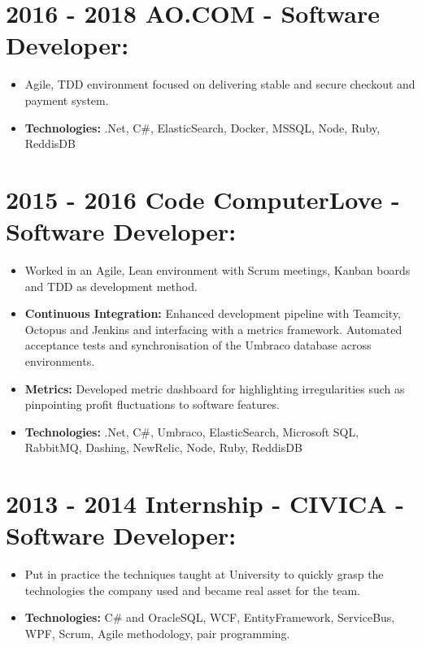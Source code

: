 \documentclass[12pt,a4paper]{res}
\begin{document}
\begin{resume}
\section{\bf 2016 - 2018 \hspace{0.3mm} AO.COM - Software Developer:}
\begin{itemize}
	\item[] Agile, TDD environment focused on delivering stable and secure checkout and payment system.
	\item \textbf{Technologies:} .Net, C\#, ElasticSearch, Docker, MSSQL, Node, Ruby, ReddisDB
	\end{itemize}
\section{\bf 2015 - 2016 \hspace{0.3mm} Code ComputerLove - Software Developer:}
\vspace{5mm}    
	\begin{itemize}
	\item[] Worked in an Agile, Lean environment with Scrum meetings, Kanban boards and TDD as development method.
	\item \textbf{Continuous Integration:} Enhanced development pipeline with Teamcity, Octopus and Jenkins and interfacing with a metrics framework. Automated acceptance tests and synchronisation of the Umbraco database across environments.
	\item \textbf{Metrics:} Developed metric dashboard for highlighting irregularities such as pinpointing profit fluctuations to software features.
	\item \textbf{Technologies:} .Net, C\#, Umbraco, ElasticSearch, Microsoft SQL, RabbitMQ, Dashing, NewRelic, Node, Ruby, ReddisDB
	\end{itemize}
	
\section{\bf 2013 - 2014 \hspace{0.5mm} Internship - CIVICA - Software Developer:}
\vspace{5mm}    
	\begin{itemize}
	\item[] Put in practice the techniques taught at University to quickly grasp the technologies the company used and became real asset for the team.
	\item{\bf Technologies:} C\# and OracleSQL, WCF, EntityFramework, ServiceBus, WPF, Scrum, Agile methodology, pair programming.
	\end{itemize}


\end{resume}
\end{document}
